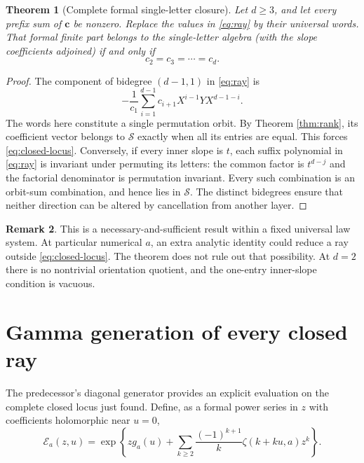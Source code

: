 \documentclass[11pt]{article}
\numberwithin{equation}{section}
\newtheorem{theorem}{Theorem}[section]
\theoremstyle{definition}
\newtheorem{remark}[theorem]{Remark}
\newcommand{\SSS}{\mathscr S}
\newcommand{\bbc}{\boldsymbol c}
\begin{document}
\begin{theorem}[Complete formal single-letter closure]\label{thm:closure}
Let $d\ge3$, and let every prefix sum of $\bbc$ be nonzero. Replace the
values in \eqref{eq:ray} by their universal words. That formal finite part
belongs to the single-letter algebra (with the slope coefficients adjoined)
if and only if
\begin{equation}\label{eq:closed-locus}
 c_2=c_3=\cdots=c_d.
\end{equation}
\end{theorem}
\begin{proof}
The component of bidegree $(d-1,1)$ in \eqref{eq:ray} is
\[
 -\frac1{c_1}\sum_{i=1}^{d-1}c_{i+1}
                   X^{i-1}YX^{d-1-i}.
\]
The words here constitute a single permutation orbit. By Theorem
\ref{thm:rank}, its coefficient vector belongs to $\SSS$ exactly when
all its entries are equal. This forces \eqref{eq:closed-locus}.
Conversely, if every inner slope is $t$, each suffix polynomial in
\eqref{eq:ray} is invariant under permuting its letters: the common factor
is $t^{d-j}$ and the factorial denominator is permutation invariant.
Every such combination is an orbit-sum combination, and hence lies in
$\SSS$. The distinct bidegrees ensure that neither direction can be
altered by cancellation from another layer.
\end{proof}

\begin{remark}
This is a necessary-and-sufficient result within a fixed universal law
system. At particular numerical $a$, an extra analytic identity could
reduce a ray outside \eqref{eq:closed-locus}. The theorem does not rule
out that possibility. At $d=2$ there is no nontrivial orientation quotient,
and the one-entry inner-slope condition is vacuous.
\end{remark}

\section{Gamma generation of every closed ray}
\label{sec:gamma-generation}
The predecessor's diagonal generator provides an explicit evaluation on
the complete closed locus just found. Define, as a formal power series in
$z$ with coefficients holomorphic near $u=0$,
\begin{equation}\label{eq:master-E}
 \mathcal E_a(z,u)=\exp\left\{
 zg_a(u)+\sum_{k\ge2}\frac{(-1)^{k+1}}k\zeta(k+ku,a)z^k\right\}.
\end{equation}
\end{document}
